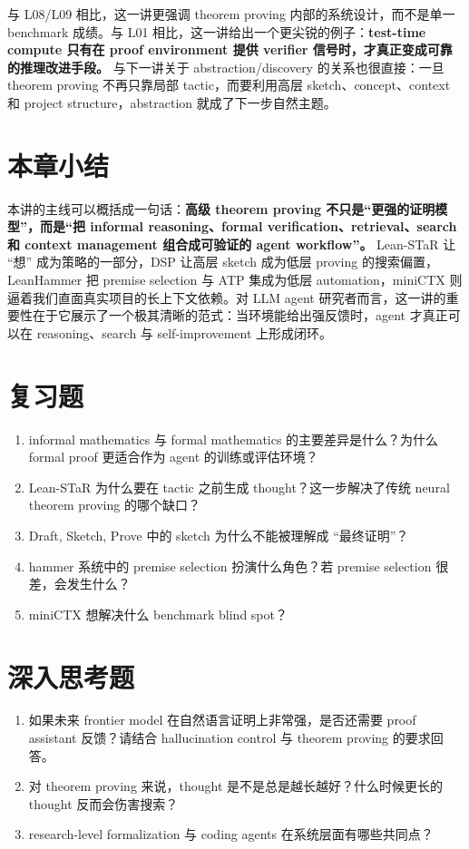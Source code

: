 \documentclass[a4paper]{article}
\begin{document}
与 L08/L09 相比，这一讲更强调 theorem proving 内部的系统设计，而不是单一 benchmark 成绩。与 L01 相比，这一讲给出一个更尖锐的例子：\textbf{test-time compute 只有在 proof environment 提供 verifier 信号时，才真正变成可靠的推理改进手段。} 与下一讲关于 abstraction/discovery 的关系也很直接：一旦 theorem proving 不再只靠局部 tactic，而要利用高层 sketch、concept、context 和 project structure，abstraction 就成了下一步自然主题。

\section{本章小结}

本讲的主线可以概括成一句话：\textbf{高级 theorem proving 不只是“更强的证明模型”，而是“把 informal reasoning、formal verification、retrieval、search 和 context management 组合成可验证的 agent workflow”。} Lean-STaR 让 ``想'' 成为策略的一部分，DSP 让高层 sketch 成为低层 proving 的搜索偏置，LeanHammer 把 premise selection 与 ATP 集成为低层 automation，miniCTX 则逼着我们直面真实项目的长上下文依赖。对 LLM agent 研究者而言，这一讲的重要性在于它展示了一个极其清晰的范式：当环境能给出强反馈时，agent 才真正可以在 reasoning、search 与 self-improvement 上形成闭环。

\section{复习题}
\begin{enumerate}
\item informal mathematics 与 formal mathematics 的主要差异是什么？为什么 formal proof 更适合作为 agent 的训练或评估环境？
\item Lean-STaR 为什么要在 tactic 之前生成 thought？这一步解决了传统 neural theorem proving 的哪个缺口？
\item Draft, Sketch, Prove 中的 sketch 为什么不能被理解成 ``最终证明''？
\item hammer 系统中的 premise selection 扮演什么角色？若 premise selection 很差，会发生什么？
\item miniCTX 想解决什么 benchmark blind spot？
\end{enumerate}

\section{深入思考题}
\begin{enumerate}
\item 如果未来 frontier model 在自然语言证明上非常强，是否还需要 proof assistant 反馈？请结合 hallucination control 与 theorem proving 的要求回答。
\item 对 theorem proving 来说，thought 是不是总是越长越好？什么时候更长的 thought 反而会伤害搜索？
\item research-level formalization 与 coding agents 在系统层面有哪些共同点？
\end{enumerate}
\end{document}
